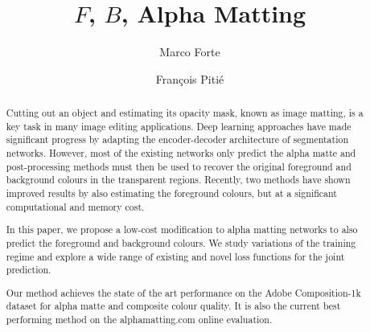 \documentclass[runningheads]{llncs}
\begin{document}
\pagestyle{headings}
\mainmatter
\def\ECCVSubNumber{6826}  \def\XXX{\textcolor{red}{XXXX}}
\def\XXXX{\textcolor{red}{XXXX}}

\newcommand{\alphap}{\bm{\hat{\alpha}}}
\newcommand{\fp}{\mathbf{\hat{{F}}}}
\newcommand{\bp}{\mathbf{\hat{{B}}}}
\newcommand{\cgt}{\mathbf{C}}

\newcommand{\alphagt}{\bm{{\alpha}}}
\newcommand{\fgt}{\mathbf{{{F}}}}
\newcommand{\bgt}{\mathbf{{{B}}}}



\title{$F$, $B$, Alpha Matting } 





\author{Marco Forte \and
Fran\c{c}ois Piti\'e} 
\maketitle
\begin{abstract}
Cutting out an object and estimating its opacity mask, known as image matting, is a key task in many image editing applications. Deep learning approaches have made significant progress by adapting the encoder-decoder architecture of segmentation networks. However, most of the existing networks only predict the alpha matte and post-processing methods must then be used to recover the original foreground and background colours in the transparent regions. Recently, two methods have shown improved results by also estimating the foreground colours, but at a significant computational and memory cost.

In this paper, we propose a low-cost modification to alpha matting networks to also predict the foreground and background colours. We study variations of the training regime and explore a wide range of existing and novel loss functions for the joint prediction. 

Our method achieves the state of the art performance on the Adobe Composition-1k dataset for alpha matte and composite colour quality. It is also the current best performing method on the alphamatting.com online evaluation. 






\end{abstract}
\end{document}
